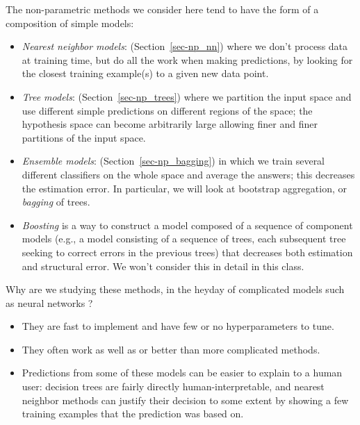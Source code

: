 The non-parametric methods we consider here tend to have the form of a
composition of simple models:
\begin{itemize}
  \item{\em Nearest neighbor models}: (Section~\ref{sec-np_nn}) where we
        don't process data at training time, but do all the work when making
        predictions, by looking for the closest training example(s) to a given
        new data point.
  \item {\em Tree models}: (Section~\ref{sec-np_trees}) where we
        partition the input space and use different simple predictions on
        different regions of the space; the hypothesis space can become
        arbitrarily large allowing finer and finer partitions of the
        input space.
  \item {\em Ensemble models}: (Section~\ref{sec-np_bagging}) in which
        we train several different classifiers on the whole space and
        average the answers; this decreases the estimation
        error. In particular, we will look at
        bootstrap aggregation, or {\em bagging} of trees.
  \item{\em Boosting} is a way to construct a model
        composed of a sequence of component models (e.g., a model consisting of
        a sequence of trees, each subsequent tree seeking to correct
        errors in the previous trees) that decreases both estimation and
        structural error. We won't consider this in detail in this class.
\end{itemize}

\medskip
Why are we studying these methods, in the heyday of complicated models such as neural networks%
?
\begin{itemize}
  \item They are fast to implement and have few or no hyperparameters
        to tune.
  \item They often work as well as or better than more complicated methods.
  \item Predictions from some of these models can be easier to explain
        to a human user: decision trees are fairly directly
        human-interpretable, and nearest neighbor methods can justify their
        decision to some extent by showing a few training examples that the
        prediction was based on.
\end{itemize}


